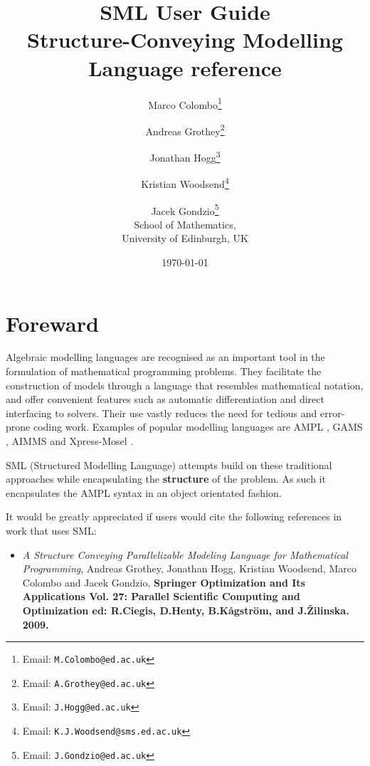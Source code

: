 \documentclass[10pt,a4paper]{book}
\begin{document}
\title{SML User Guide \\
Structure-Conveying Modelling Language reference}
\author{Marco Colombo\thanks{Email: {\tt M.Colombo@ed.ac.uk}}
\and Andreas Grothey\thanks{Email: {\tt A.Grothey@ed.ac.uk}}
\and Jonathan Hogg\thanks{Email: {\tt J.Hogg@ed.ac.uk}}
\and Kristian Woodsend\thanks{Email: {\tt K.J.Woodsend@sms.ed.ac.uk}}
\and Jacek Gondzio\thanks{Email: {\tt J.Gondzio@ed.ac.uk}} \\[3ex]
School of Mathematics, \\ University of Edinburgh, UK
}

\date{\today}

\maketitle

\section*{Foreward}
\label{sec:Intro}

Algebraic modelling languages are recognised as an important tool in the
formulation of mathematical programming problems. They facilitate the
construction of models through a language that resembles mathematical
notation, and offer convenient features such as automatic differentiation and
direct interfacing to solvers. Their use vastly reduces the need for tedious
and error-prone coding work. Examples of popular modelling languages
are AMPL \cite{mybib:AMPL}, GAMS \cite{mybib:GAMS}, AIMMS \cite{mybib:AIMMS}
and Xpress-Mosel \cite{mybib:Mosel}.

SML (Structured Modelling Language) attempts build on these traditional
approaches while encapsulating the {\bf structure} of the problem. As such
it encapsulates the AMPL syntax in an object orientated fashion.

It would be greatly appreciated if users would cite the following references
in work that uses SML:
\begin{itemize}
   \item {\it A Structure Conveying Parallelizable Modeling Language for Mathematical Programming}, Andreas Grothey, Jonathan Hogg, Kristian Woodsend, Marco Colombo and Jacek Gondzio, {\bf Springer Optimization and Its Applications Vol. 27: Parallel Scientific Computing and Optimization ed: R.Ciegis, D.Henty, B.K\r{a}gstr\"{o}m, and J.\v{Z}ilinska. 2009.}
\end{itemize}
\end{document}

